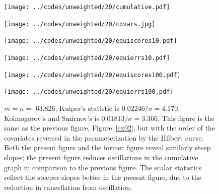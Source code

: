 \documentclass[]{fairmeta}
\begin{document}
\begin{figure}
\begin{centering}

\parbox{\imsize}{\texttt{[image: ../codes/unweighted/20/cumulative.pdf]}}
\quad\quad
\parbox{\imsize}{\texttt{[image: ../codes/unweighted/20/covars.jpg]}}

\vspace{\vertsep}

\parbox{\imsize}{\texttt{[image: ../codes/unweighted/20/equiscores10.pdf]}}
\quad\quad
\parbox{\imsize}{\texttt{[image: ../codes/unweighted/20/equierrs10.pdf]}}

\vspace{\vertsep}

\parbox{\imsize}{\texttt{[image: ../codes/unweighted/20/equiscores100.pdf]}}
\quad\quad
\parbox{\imsize}{\texttt{[image: ../codes/unweighted/20/equierrs100.pdf]}}

\end{centering}
\caption{$m = n =$ 63,826;
         Kuiper's statistic is $0.02246 / \sigma = 4.170$,
         Kolmogorov's and Smirnov's is $0.01813 / \sigma = 3.366$.
         This figure is the same as the previous figure, Figure~\ref{ex02},
         but with the order of the covariates reversed in the parameterization
         by the Hilbert curve. Both the present figure and the former figure
         reveal similarly steep slopes; the present figure reduces oscillations
         in the cumulative graph in comparison to the previous figure.
         The scalar statistics reflect the steeper slopes better
         in the present figure, due to the reduction in cancellation
         from oscillation.
}
\label{ex20}
\end{figure}
\end{document}
